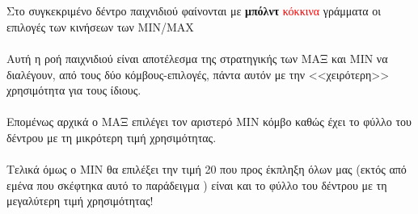 \documentclass[12pt]{article}
\begin{document}
\begin{otherlanguage}{english}
\usetikzlibrary{trees}
\end{otherlanguage}\\\\
Στο συγκεκριμένο δέντρο παιχνιδιού φαίνονται με \textbf{μπόλντ} \textcolor{red}{κόκκινα} γράμματα οι επιλογές των κινήσεων των MIN/MAX\\\\
Αυτή η ροή παιχνιδιού είναι αποτέλεσμα της στρατηγικής των ΜΑΞ και ΜΙΝ να διαλέγουν, από τους δύο κόμβους-επιλογές, πάντα αυτόν με την <<χειρότερη>> χρησιμότητα για τους ίδιους.\\\\
Επομένως αρχικά ο ΜΑΞ επιλέγει τον αριστερό ΜΙΝ κόμβο καθώς έχει το φύλλο του δέντρου με τη μικρότερη τιμή χρησιμότητας.\\\\
Τελικά όμως ο ΜΙΝ θα επιλέξει την τιμή 20 που προς έκπληξη όλων μας (εκτός από εμένα που σκέφτηκα αυτό το παράδειγμα ) είναι και το φύλλο του δέντρου με τη μεγαλύτερη τιμή χρησιμότητας!\\\\\\
\end{document}

